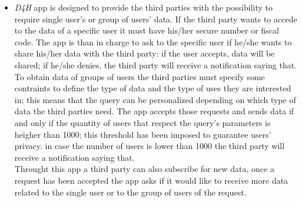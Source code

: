\begin{itemize}
	\item{\textit{D4H} app is designed to provide the third parties with the possibility to require single user's or group of users' data.
		If the third party wants to accede to the data of  a specific user it must have his/her secure number or fiscal code. The app is than in charge to ask to the specific user if he/she wants to share his/her data with the third party: if the user accepts, data will be shared; if he/she denies, the third party will receive a notification saying that.\\
		To obtain data of groups of users the third parties must specify some contraints to define the type of data and the type of uses they are interested in; this means that the query can be personalized depending on which type of data the third parties need. The app accepts those requests and sends data if and only if the quantity of users that respect the query's parameters is heigher than 1000; this threshold has been imposed to guarantee users' privacy. in case the number of users is lower than 1000 the third party will receive a notification saying that.\\
		Throught this app a third party can also subscribe for new data, once a request has been accepted the app asks if it would like to receive more data related to the single user or to the group of users of the request.}
		
\end{itemize}